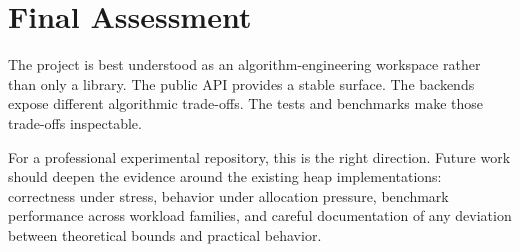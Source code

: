 \section{Final Assessment}

The project is best understood as an algorithm-engineering workspace rather than only a library.
The public API provides a stable surface.
The backends expose different algorithmic trade-offs.
The tests and benchmarks make those trade-offs inspectable.

For a professional experimental repository, this is the right direction.
Future work should deepen the evidence around the existing heap implementations: correctness under stress, behavior under allocation pressure, benchmark performance across workload families, and careful documentation of any deviation between theoretical bounds and practical behavior.
